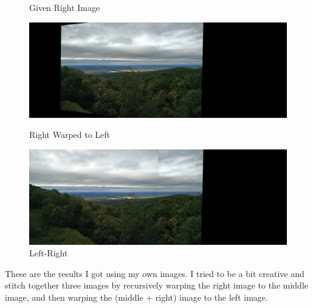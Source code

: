 \begin{figure}[H]
\begin{minipage}{0.39\textwidth}
    \caption{Given Right Image}
    \label{fig:right-image}
  \end{minipage}
  \hfill
  \begin{minipage}{0.89\textwidth}
    \includegraphics[width=\textwidth]{images/warped-right-0.jpg}
    \caption{Right Warped to Left}
    \label{fig:cv-desk}
  \end{minipage}
  \hfill
  \begin{minipage}{0.89\textwidth}
    \includegraphics[width=\textwidth]{images/panorama-0.jpg}
    \caption{Left-Right}
    \label{fig:hp-desk}
  \end{minipage}
\end{figure}

\newpage
These are the results I got using my own images.
I tried to be a bit creative and stitch together three images
by recursively warping the right image to the middle image,
and then warping the (middle + right) image to the left image.

